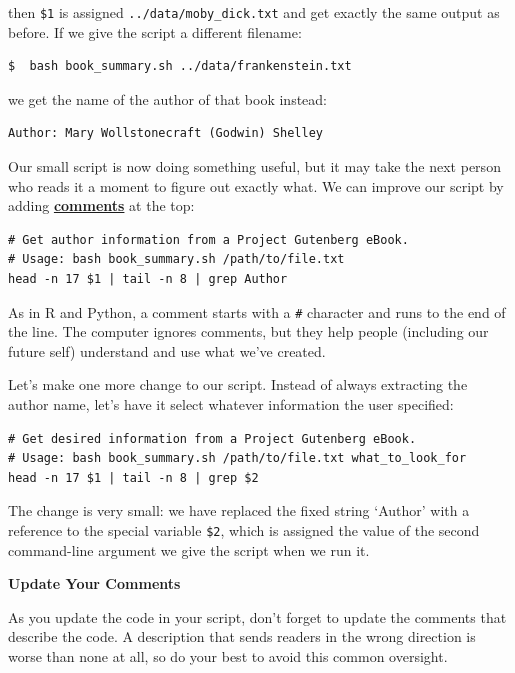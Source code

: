 \documentclass[
]{krantz}
\renewenvironment{quote}{\begin{VF}}{\end{VF}}
\newcommand{\gref}[2]{\hyperlink{#2}{\textbf{#1}}}
\begin{document}
then \texttt{\$1} is assigned \texttt{../data/moby\_dick.txt}
and get exactly the same output as before.
If we give the script a different filename:

\begin{verbatim}
$  bash book_summary.sh ../data/frankenstein.txt
\end{verbatim}

we get the name of the author of that book instead:

\begin{verbatim}
Author: Mary Wollstonecraft (Godwin) Shelley
\end{verbatim}

Our small script is now doing something useful,
but it may take the next person who reads it a moment to figure out exactly what.
We can improve our script by adding \gref{comments}{comment} at the top:

\begin{verbatim}
# Get author information from a Project Gutenberg eBook.
# Usage: bash book_summary.sh /path/to/file.txt
head -n 17 $1 | tail -n 8 | grep Author
\end{verbatim}

As in R and Python,
a comment starts with a \texttt{\#} character and runs to the end of the line.
The computer ignores comments,
but they help people (including our future self) understand and use what we've created.

Let's make one more change to our script.
Instead of always extracting the author name,
let's have it select whatever information the user specified:

\begin{verbatim}
# Get desired information from a Project Gutenberg eBook.
# Usage: bash book_summary.sh /path/to/file.txt what_to_look_for
head -n 17 $1 | tail -n 8 | grep $2
\end{verbatim}

The change is very small:
we have replaced the fixed string `Author' with a reference to the special variable \texttt{\$2},
which is assigned the value of the second command-line argument we give the script when we run it.

\begin{quote}
\textbf{Update Your Comments}

As you update the code in your script,
don't forget to update the comments that describe the code.
A description that sends readers in the wrong direction is worse than none at all,
so do your best to avoid this common oversight.
\end{quote}
\end{document}

